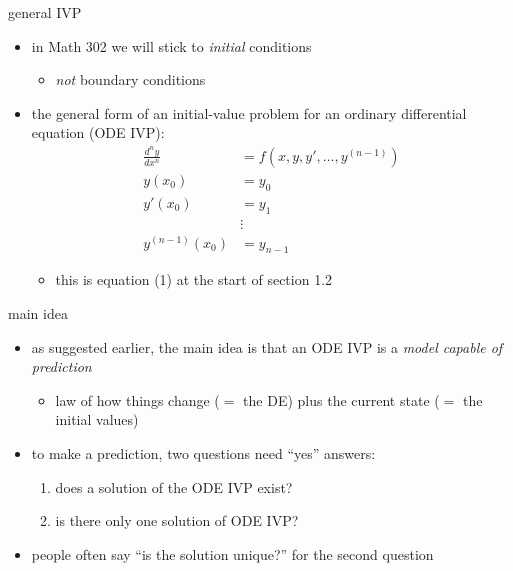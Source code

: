 \documentclass{beamer}
\begin{document}
\begin{frame}{general IVP}

\begin{itemize}
\item in Math 302 we will stick to \emph{initial} conditions
    \begin{itemize}
    \item \emph{not} boundary conditions
    \end{itemize}
\item the general form of an initial-value problem for an ordinary differential equation (ODE IVP):
\begin{align*}
\frac{d^n y}{dx^n} &= f(x,y,y',\dots,y^{(n-1)}) \\
y(x_0) &= y_0 \\
y'(x_0) &= y_1 \\
   &\vdots \\
y^{(n-1)}(x_0) &= y_{n-1}
\end{align*}

\vspace{-1mm}
     \begin{itemize}
     \item this is equation (1) at the start of section 1.2
     \end{itemize}
\end{itemize}
\end{frame}


\begin{frame}{main idea}

\begin{itemize}
\item as suggested earlier, the main idea is that an ODE IVP is a \emph{model capable of prediction}
    \begin{itemize}
    \item law of how things change ($=$ the DE) plus the current state ($=$ the initial values)
    \end{itemize}
\item to make a prediction, two questions need ``yes'' answers:
    \begin{enumerate}
    \item does a solution of the ODE IVP exist?
    \item is there only one solution of ODE IVP?
    \end{enumerate}
\item people often say ``is the solution unique?'' for the second question
\end{itemize}
\end{frame}
\end{document}
